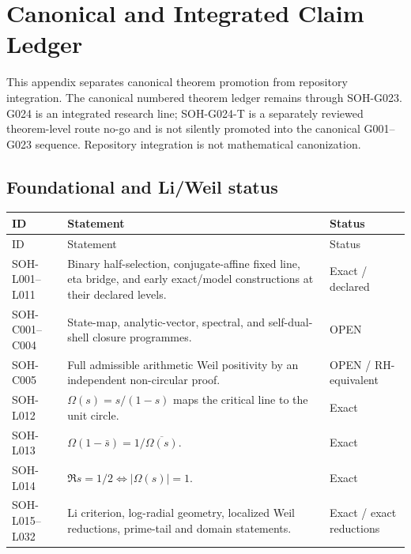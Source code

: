 \chapter{Canonical and Integrated Claim Ledger}
\label{app:claims}

This appendix separates canonical theorem promotion from repository integration. The canonical numbered theorem ledger remains through SOH-G023. G024 is an integrated research line; SOH-G024-T is a separately reviewed theorem-level route no-go and is not silently promoted into the canonical G001--G023 sequence. Repository integration is not mathematical canonization.

\section{Foundational and Li/Weil status}
\begin{longtable}{@{}p{}p{}p{}@{}}
\toprule ID & Statement & Status\\
\midrule\endfirsthead\toprule ID & Statement & Status\\\midrule\endhead
SOH-L001--L011 & Binary half-selection, conjugate-affine fixed line, eta bridge, and early exact/model constructions at their declared levels. & Exact / declared\\
SOH-C001--C004 & State-map, analytic-vector, spectral, and self-dual-shell closure programmes. & OPEN\\
SOH-C005 & Full admissible arithmetic Weil positivity by an independent non-circular proof. & OPEN / RH-equivalent\\
SOH-L012 & $\Omega(s)=s/(1-s)$ maps the critical line to the unit circle. & Exact\\
SOH-L013 & $\Omega(1-\bar s)=1/\overline{\Omega(s)}$. & Exact\\
SOH-L014 & $\Re s=1/2\iff|\Omega(s)|=1$. & Exact\\
SOH-L015--L032 & Li criterion, log-radial geometry, localized Weil reductions, prime-tail and domain statements. & Exact / exact reductions\\
\bottomrule
\end{longtable}

